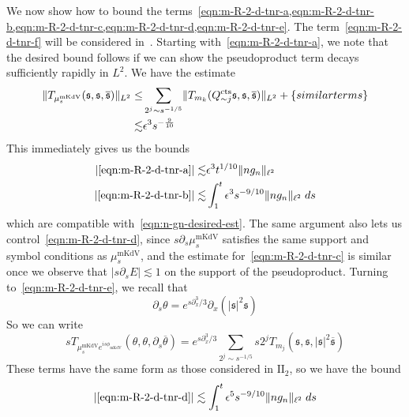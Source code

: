 \documentclass[letterpaper, reqno,final]{amsart}
\newcommand{\fs}{\mathfrak{s}}
\newcommand{\rmII}{\mathrm{II}}
\newcommand{\tmkdv}{\text{mKdV}}
\newcommand{\phimKdV}{\phi_{\tmkdv}}
\newcommand{\tcts}{\text{cts}}
\newcommand{\btext}[1]{\left\{\textup{#1}\right\}}
\newcommand{\bsim}{\btext{similar terms}}
\newcommand{\bsime}{\btext{similar or easier terms}}
\begin{document}
We now show how to bound the terms~\cref{eqn:m-R-2-d-tnr-a,eqn:m-R-2-d-tnr-b,eqn:m-R-2-d-tnr-c,eqn:m-R-2-d-tnr-d,eqn:m-R-2-d-tnr-e}.  The term~\eqref{eqn:m-R-2-d-tnr-f} will be considered in~.  Starting with~\eqref{eqn:m-R-2-d-tnr-a}, we note that the desired bound follows if we can show the pseudoproduct term decays sufficiently rapidly in $L^2$.  We have the estimate
\begin{equation}\label{eqn:mu-tmkdv-est}\begin{split}
    \lVert T_{\mu_s^\tmkdv }(\fs,\fs, \overline{\fs}) \rVert_{L^2} \leq& \sum_{2^j \sim s^{-1/5}} \lVert T_{m_k}(Q_{\sim j}^{\tcts} \fs, \fs, \overline{\fs})\rVert_{L^2} + \bsim\\
    \lesssim& \epsilon^3 s^{-\frac{9}{10}}
\end{split}\end{equation}
This immediately gives us the bounds
\begin{equation*}\begin{split}
    |\eqref{eqn:m-R-2-d-tnr-a}| \lesssim& \epsilon^3 t^{1/10} \lVert n g_n \rVert_{\ell^2}\\
    |\eqref{eqn:m-R-2-d-tnr-b}| \lesssim& \int_1^t \epsilon^3 s^{-9/10} \lVert ng_n \rVert_{\ell^2} \;ds
\end{split}\end{equation*}
which are compatible with~\eqref{eqn:n-gn-desired-est}.  The same argument also lets us control~\eqref{eqn:m-R-2-d-tnr-d}, since $s\partial_s \mu_s^\tmkdv$ satisfies the same support and symbol conditions as $\mu_s^\tmkdv$, and the estimate for~\eqref{eqn:m-R-2-d-tnr-c} is similar once we observe that $|s \partial_s E| \lesssim 1$ on the support of the pseudoproduct.
Turning to~\eqref{eqn:m-R-2-d-tnr-e}, we recall that
\begin{equation*}
    \partial_s \theta = e^{s\partial_x^3/3} \partial_x(|\fs|^2 \fs)
\end{equation*}
So we can write
\begin{equation*}
     sT_{\mu_s^\tmkdv e^{is\phimKdV}}(\theta, \theta, \partial_s \overline{\theta}) = e^{s\partial_x^3/3} \sum_{2^j \sim s^{-1/5}} s2^j T_{m_j}(\fs, \fs, |\fs|^2\overline{\fs})
\end{equation*}
These terms have the same form as those considered in $\rmII_2$, so we have the bound
\begin{equation*}
    |\eqref{eqn:m-R-2-d-tnr-d} | \lesssim  \int_1^t \epsilon^5 s^{-9/10} \lVert n g_n \rVert_{\ell^2}\;ds
\end{equation*}
\end{document}
